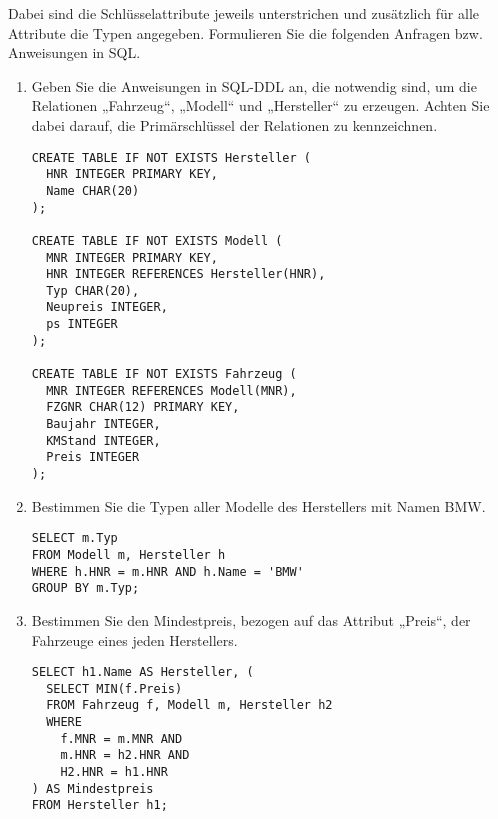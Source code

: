 \documentclass{bschlangaul-aufgabe}
\begin{document}
Dabei sind die Schlüsselattribute jeweils unterstrichen und zusätzlich
für alle Attribute die Typen angegeben. Formulieren Sie die folgenden
Anfragen bzw. Anweisungen in SQL.

\begin{enumerate}


\item Geben Sie die Anweisungen in SQL-DDL an, die notwendig sind, um
die Relationen „Fahrzeug“, „Modell“ und „Hersteller“ zu erzeugen. Achten
Sie dabei darauf, die Primärschlüssel der Relationen zu kennzeichnen.

\begin{bAntwort}
\begin{verbatim}
CREATE TABLE IF NOT EXISTS Hersteller (
  HNR INTEGER PRIMARY KEY,
  Name CHAR(20)
);

CREATE TABLE IF NOT EXISTS Modell (
  MNR INTEGER PRIMARY KEY,
  HNR INTEGER REFERENCES Hersteller(HNR),
  Typ CHAR(20),
  Neupreis INTEGER,
  ps INTEGER
);

CREATE TABLE IF NOT EXISTS Fahrzeug (
  MNR INTEGER REFERENCES Modell(MNR),
  FZGNR CHAR(12) PRIMARY KEY,
  Baujahr INTEGER,
  KMStand INTEGER,
  Preis INTEGER
);
\end{verbatim}
\end{bAntwort}


\item Bestimmen Sie die Typen aller Modelle des Herstellers mit Namen
BMW.

\begin{bAntwort}
\begin{verbatim}
SELECT m.Typ
FROM Modell m, Hersteller h
WHERE h.HNR = m.HNR AND h.Name = 'BMW'
GROUP BY m.Typ;
\end{verbatim}
\end{bAntwort}


\item Bestimmen Sie den Mindestpreis, bezogen auf das Attribut „Preis“,
der Fahrzeuge eines jeden Herstellers.

\begin{bAntwort}
\begin{verbatim}
SELECT h1.Name AS Hersteller, (
  SELECT MIN(f.Preis)
  FROM Fahrzeug f, Modell m, Hersteller h2
  WHERE
    f.MNR = m.MNR AND
    m.HNR = h2.HNR AND
    H2.HNR = h1.HNR
) AS Mindestpreis
FROM Hersteller h1;
\end{verbatim}
\end{bAntwort}


\end{enumerate}
\end{document}
